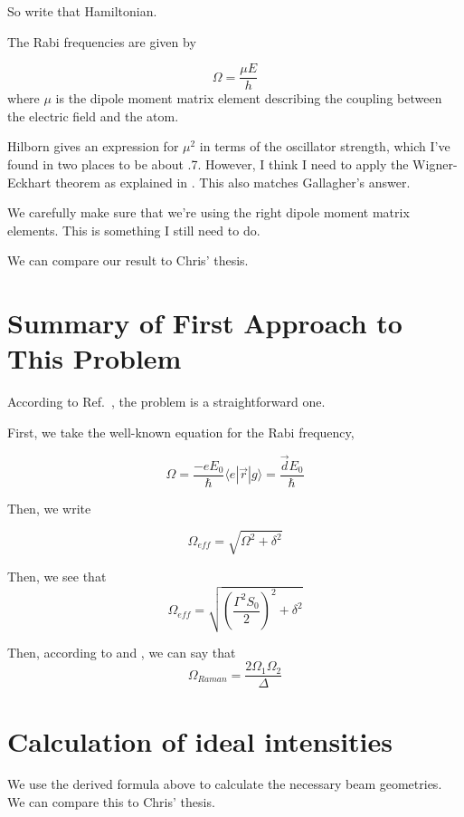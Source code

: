 So write that Hamiltonian.  


The Rabi frequencies are given by 

\begin{equation}
\Omega=\frac{\mu E}{h}
\end{equation} \cite{hilbornNoGetConfused}
where $\mu$ is the dipole moment matrix element describing the coupling between the electric field and the atom. 

Hilborn gives an expression for $\mu^2$ in terms of the oscillator strength, which I've found in two places \cite{safronovaTheory} \cite{NISTasd} to be about .7. However, I think I need to apply the Wigner-Eckhart theorem as explained in \cite{demilleBudkerKimball}. This also matches Gallagher's answer. 

We carefully make sure that we're using the right dipole moment matrix elements. This is something I still need to do. 

We can compare our result to Chris' thesis. 

\section{Summary of First Approach to This Problem}

According to Ref.\ \cite{cjeDiss}, the problem is a straightforward one.

First, we take the well-known equation for the Rabi frequency, 

\begin{equation}
\Omega = \frac{-eE_0}{\hbar}\langle e |\vec{r}|g\rangle=\frac{\vec{d}E_0}{\hbar}
\end{equation}

Then, we write 

\begin{equation}
\Omega_\mathit{eff}=\sqrt{\Omega^2+\delta^2}
\end{equation}

Then, we see that 
\begin{equation}
\Omega_\mathit{eff}=\sqrt{\left(\frac{\Gamma^2S_0}{2}\right)^2 + \delta^2}
\end{equation}

Then, according to \cite{RamanBeamSplit} and \cite{footAtomicPhysics}, we can say that 
\begin{equation} \label{KorsunskysJewel}
\Omega_\mathit{Raman}=\frac{2\Omega_1\Omega_2}{\Delta}
\end{equation}

  \section{Calculation of ideal intensities}

We use the derived formula above to calculate the necessary beam geometries. We can compare this to Chris' thesis. 


